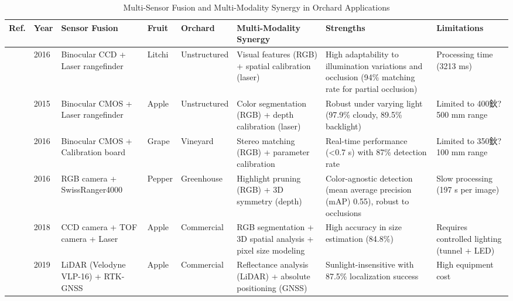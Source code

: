 \documentclass[a4paper,fleqn]{cas-dc}
\begin{document}
\begin{table}[ht]
\scriptsize
\centering
\caption{Multi-Sensor Fusion and Multi-Modality Synergy in Orchard Applications} 
\label{tab:dataset}
\begin{tabular}{p{}p{}p{}p{}p{}p{}p{}p{}}
\hline
\textbf{Ref.} & \textbf{Year} & \textbf{Sensor Fusion} & \textbf{Fruit} & \textbf{Orchard} & \textbf{Multi-Modality Synergy} & \textbf{Strengths} & \textbf{Limitations} \\ 
\hline
\cite{wang2016localisation} & 2016 & Binocular CCD + Laser rangefinder & Litchi & Unstructured & Visual features (RGB) + spatial calibration (laser) & High adaptability to illumination variations and occlusion (94\% matching rate for partial occlusion) & Processing time (3213 ms) \\ 
\hline
\cite{si2015location} & 2015 & Binocular CMOS + Laser rangefinder & Apple & Unstructured & Color segmentation (RGB) + depth calibration (laser) & Robust under varying light (97.9\% cloudy, 89.5\% backlight) & Limited to 400鈥?500 mm range  \\ 
\hline
\cite{luo2016vision} & 2016 & Binocular CMOS + Calibration board & Grape & Vineyard & Stereo matching (RGB) + parameter calibration & Real-time performance (<0.7 s) with 87\% detection rate & Limited to 350鈥?100 mm range  \\ 
\hline
\cite{barnea2016colour} & 2016 & RGB camera + SwissRanger4000 & Pepper & Greenhouse & Highlight pruning (RGB) + 3D symmetry (depth) & Color-agnostic detection (mean average precision (mAP) 0.55), robust to occlusions & Slow processing (197 s per image)  \\ 
\hline
\cite{gongal2018apple} & 2018 & CCD camera + TOF camera + Laser & Apple & Commercial & RGB segmentation + 3D spatial analysis + pixel size modeling & High accuracy in size estimation (84.8\%) & Requires controlled lighting (tunnel + LED) \\ 
\hline
\cite{gene2019fruit} & 2019 & LiDAR (Velodyne VLP-16) + RTK-GNSS & Apple & Commercial & Reflectance analysis (LiDAR) + absolute positioning (GNSS) & Sunlight-insensitive with 87.5\% localization success & High equipment cost  \\ 

\end{tabular}
\end{table}
\end{document}
